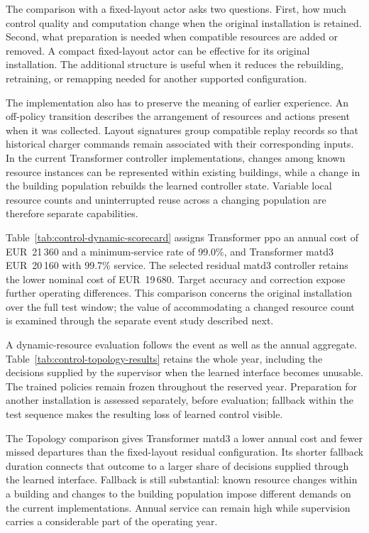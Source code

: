 The comparison with a fixed-layout actor asks two questions. First, how much control quality and computation change when the original installation is retained. Second, what preparation is needed when compatible resources are added or removed. A compact fixed-layout actor can be effective for its original installation. The additional structure is useful when it reduces the rebuilding, retraining, or remapping needed for another supported configuration.

The implementation also has to preserve the meaning of earlier experience. An off-policy transition describes the arrangement of resources and actions present when it was collected. Layout signatures group compatible replay records so that historical charger commands remain associated with their corresponding inputs. In the current Transformer controller implementations, changes among known resource instances can be represented within existing buildings, while a change in the building population rebuilds the learned controller state. Variable local resource counts and uninterrupted reuse across a changing population are therefore separate capabilities.



\illustrativereading Table~\ref{tab:control-dynamic-scorecard} assigns Transformer \gls{ppo} an annual cost of EUR~21\,360 and a minimum-service rate of 99.0\%, and Transformer \gls{matd3} EUR~20\,160 with 99.7\% service. The selected residual \gls{matd3} controller retains the lower nominal cost of EUR~19\,680. Target accuracy and correction expose further operating differences. This comparison concerns the original installation over the full test window; the value of accommodating a changed resource count is examined through the separate event study described next.

A dynamic-resource evaluation follows the event as well as the annual aggregate. Table~\ref{tab:control-topology-results} retains the whole year, including the decisions supplied by the supervisor when the learned interface becomes unusable. The trained policies remain frozen throughout the reserved year. Preparation for another installation is assessed separately, before evaluation; fallback within the test sequence makes the resulting loss of learned control visible.



\illustrativereading The Topology comparison gives Transformer \gls{matd3} a lower annual cost and fewer missed departures than the fixed-layout residual configuration. Its shorter fallback duration connects that outcome to a larger share of decisions supplied through the learned interface. Fallback is still substantial: known resource changes within a building and changes to the building population impose different demands on the current implementations. Annual service can remain high while supervision carries a considerable part of the operating year.

